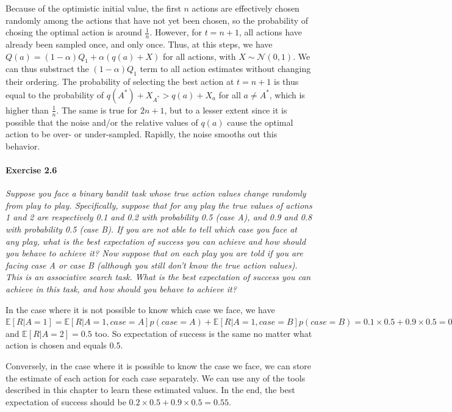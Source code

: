 Because of the optimistic initial value, the first $n$ actions are effectively chosen randomly among the actions that have not yet been chosen, so the probability of chosing the optimal action is around $\frac{1}{n}$.
However, for $t = n+1$, all actions have already been sampled once, and only once.
Thus, at this steps, we have $Q(a) = (1 - \alpha) Q_1 + \alpha (q(a) + X)$ for all actions, with $X \sim \mathcal{N}(0,1)$.
We can thus substract the $(1-\alpha)Q_1$ term to all action estimates without changing their ordering.
The probability of selecting the best action at $t = n+1$ is thus equal to the probability of $q(A^*) + X_{A^*} > q(a) + X_a$ for all $a \neq A^*$, which is higher than $\frac{1}{n}$.
The same is true for $2n+1$, but to a lesser extent since it is possible that the noise and/or the relative values of $q(a)$ cause the optimal action to be over- or under-sampled.
Rapidly, the noise smooths out this behavior.

\paragraph{Exercise 2.6}
\textit{Suppose you face a binary bandit task whose true action values
change randomly from play to play. Specifically, suppose that for any play the
true values of actions 1 and 2 are respectively 0.1 and 0.2 with probability 0.5
(case A), and 0.9 and 0.8 with probability 0.5 (case B). If you are not able to
tell which case you face at any play, what is the best expectation of success
you can achieve and how should you behave to achieve it? Now suppose that
on each play you are told if you are facing case A or case B (although you still
don’t know the true action values). This is an associative search task. What
is the best expectation of success you can achieve in this task, and how should
you behave to achieve it?}

In the case where it is not possible to know which case we face, we have $\mathbb{E}[R|A=1] = \mathbb{E}[R|A=1,case=A]p(case=A) + \mathbb{E}[R|A=1,case=B]p(case=B) = 0.1 \times 0.5 + 0.9 \times 0.5 = 0.5$ and $\mathbb{E}[R|A=2] = 0.5$ too.
So expectation of success is the same no matter what action is chosen and equals 0.5.

Conversely, in the case where it is possible to know the case we face, we can store the estimate of each action for each case separately.
We can use any of the tools described in this chapter to learn these estimated values.
In the end, the best expectation of success should be $0.2 \times 0.5 + 0.9 \times 0.5 = 0.55$.
